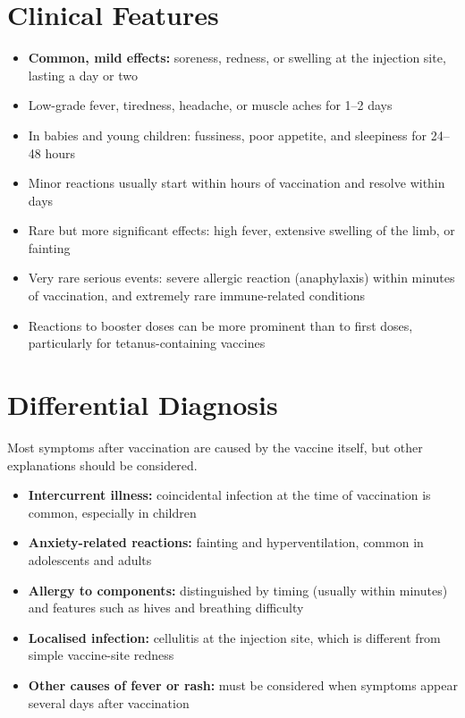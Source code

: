\section*{Clinical Features}
\begin{itemize}
    \item \textbf{Common, mild effects:} soreness, redness, or swelling at the injection site, lasting a day or two
    \item Low-grade fever, tiredness, headache, or muscle aches for 1--2 days
    \item In babies and young children: fussiness, poor appetite, and sleepiness for 24--48 hours
    \item Minor reactions usually start within hours of vaccination and resolve within days
    \item Rare but more significant effects: high fever, extensive swelling of the limb, or fainting
    \item Very rare serious events: severe allergic reaction (anaphylaxis) within minutes of vaccination, and extremely rare immune-related conditions
    \item Reactions to booster doses can be more prominent than to first doses, particularly for tetanus-containing vaccines
\end{itemize}

\section*{Differential Diagnosis}
Most symptoms after vaccination are caused by the vaccine itself, but other explanations should be considered.
\begin{itemize}
    \item \textbf{Intercurrent illness:} coincidental infection at the time of vaccination is common, especially in children
    \item \textbf{Anxiety-related reactions:} fainting and hyperventilation, common in adolescents and adults
    \item \textbf{Allergy to components:} distinguished by timing (usually within minutes) and features such as hives and breathing difficulty
    \item \textbf{Localised infection:} cellulitis at the injection site, which is different from simple vaccine-site redness
    \item \textbf{Other causes of fever or rash:} must be considered when symptoms appear several days after vaccination
\end{itemize}

